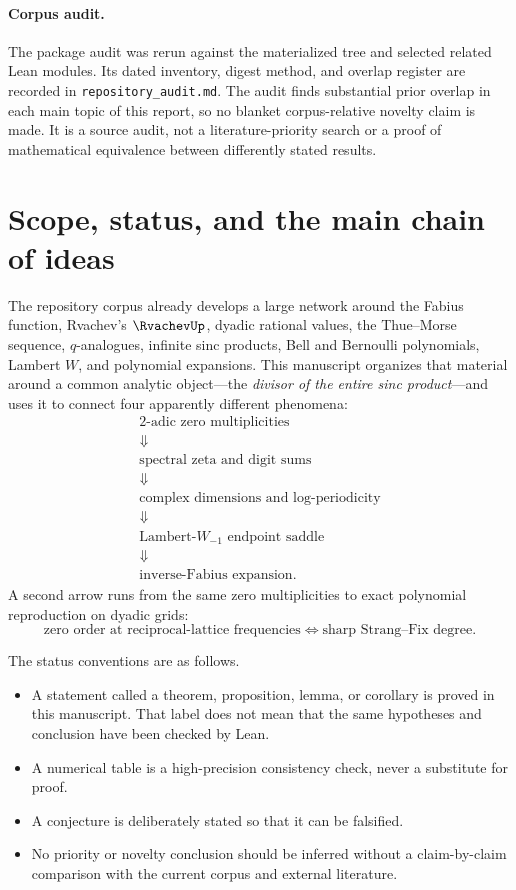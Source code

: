 \documentclass[11pt,oneside]{article}
\theoremstyle{definition}
\theoremstyle{remark}
\begin{document}
\paragraph{Corpus audit.}
The package audit was rerun against the materialized
 tree and selected related Lean modules.
Its dated inventory, digest method, and overlap register are recorded in
\texttt{repository\_audit.md}.  The audit finds substantial prior overlap in
each main topic of this report, so no blanket corpus-relative novelty claim is
made.  It is a source audit, not a literature-priority search or a proof of
mathematical equivalence between differently stated results.

\tableofcontents

\section{Scope, status, and the main chain of ideas}

The repository corpus already develops a large network around the Fabius
function, Rvachev's \(\RvachevUp\), dyadic rational values, the Thue--Morse
sequence, \(q\)-analogues, infinite sinc products, Bell and Bernoulli
polynomials, Lambert \(W\), and polynomial expansions.  This manuscript
organizes that material around a common analytic object---the \emph{divisor
of the entire sinc product}---and uses it to connect four apparently
different phenomena:
\[
\boxed{
\begin{array}{c}
\text{\(2\)-adic zero multiplicities}\\
\Downarrow\\
\text{spectral zeta and digit sums}\\
\Downarrow\\
\text{complex dimensions and log-periodicity}\\
\Downarrow\\
\text{Lambert-\(W_{-1}\) endpoint saddle}\\
\Downarrow\\
\text{inverse-Fabius expansion}.
\end{array}}
\]
A second arrow runs from the same zero multiplicities to exact polynomial
reproduction on dyadic grids:
\[
 \text{zero order at reciprocal-lattice frequencies}
 \Longleftrightarrow
 \text{sharp Strang--Fix degree}.
\]

The status conventions are as follows.

\begin{itemize}[leftmargin=2em]
\item A statement called a theorem, proposition, lemma, or corollary is proved
      in this manuscript.  That label does not mean that the same hypotheses
      and conclusion have been checked by Lean.
\item A numerical table is a high-precision consistency check, never a
      substitute for proof.
\item A conjecture is deliberately stated so that it can be falsified.
\item No priority or novelty conclusion should be inferred without a
      claim-by-claim comparison with the current corpus and external
      literature.
\end{itemize}
\end{document}
